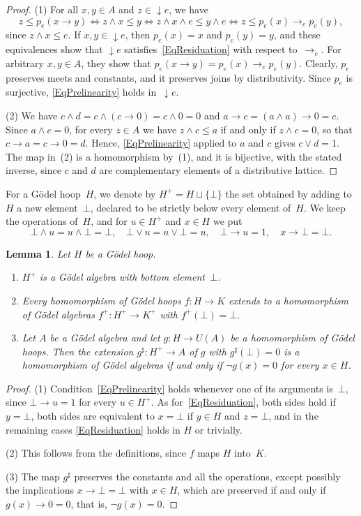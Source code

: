 \documentclass[reqno,a4paper]{amsart}
\theoremstyle{plain}
\newtheorem{lemma}[subsection]{Lemma}
\theoremstyle{definition}
\theoremstyle{remark}
\numberwithin{equation}{section}
\newcommand{\down}{{\downarrow}}
\begin{document}
\begin{proof}
(1) For all $x,y\in A$ and $z\in{\down}e$, we have
\[
z\leq p_e(x\to y)\iff z\wedge x\leq y\iff z\wedge x\wedge e\leq y\wedge e\iff z\leq p_e(x)\to_e p_e(y),
\]
since $z\wedge x\leq e$. If $x,y\in{\down}e$, then $p_e(x)=x$ and $p_e(y)=y$, and these equivalences show that ${\down}e$ satisfies~\eqref{EqResiduation} with respect to~$\to_e$. For arbitrary $x,y\in A$, they show that $p_e(x\to y)=p_e(x)\to_e p_e(y)$. Clearly, $p_e$ preserves meets and constants, and it preserves joins by distributivity. Since $p_e$ is surjective, \eqref{EqPrelinearity} holds in~${\down}e$.

(2) We have $c\wedge d=c\wedge(c\to0)=c\wedge0=0$ and $a\to c=(a\wedge a)\to0=c$. Since $a\wedge c=0$, for every $z\in A$ we have $z\wedge c\leq a$ if and only if $z\wedge c=0$, so that $c\to a=c\to0=d$. Hence, \eqref{EqPrelinearity} applied to $a$ and $c$ gives $c\vee d=1$. The map in~(2) is a homomorphism by~(1), and it is bijective, with the stated inverse, since $c$ and $d$ are complementary elements of a distributive lattice.
\end{proof}

For a G\"odel hoop~$H$, we denote by $H^+=H\sqcup\{\bot\}$ the set obtained by adding to~$H$ a new element~$\bot$, declared to be strictly below every element of~$H$. We keep the operations of~$H$, and for $u\in H^+$ and $x\in H$ we put
\[
\bot\wedge u=u\wedge\bot=\bot,\quad \bot\vee u=u\vee\bot=u,\quad \bot\to u=1,\quad x\to\bot=\bot.
\]

\begin{lemma}\label{LemPlus}
Let $H$ be a G\"odel hoop.
\begin{enumerate}
\item $H^+$ is a G\"odel algebra with bottom element~$\bot$.
\item Every homomorphism of G\"odel hoops $f\colon H\to K$ extends to a homomorphism of G\"odel algebras $f^+\colon H^+\to K^+$ with $f^+(\bot)=\bot$.
\item Let $A$ be a G\"odel algebra and let $g\colon H\to U(A)$ be a homomorphism of G\"odel hoops. Then the extension $g^\sharp\colon H^+\to A$ of $g$ with $g^\sharp(\bot)=0$ is a homomorphism of G\"odel algebras if and only if $\neg g(x)=0$ for every $x\in H$.
\end{enumerate}
\end{lemma}

\begin{proof}
(1) Condition~\eqref{EqPrelinearity} holds whenever one of its arguments is~$\bot$, since $\bot\to u=1$ for every $u\in H^+$. As for~\eqref{EqResiduation}, both sides hold if $y=\bot$, both sides are equivalent to $x=\bot$ if $y\in H$ and $z=\bot$, and in the remaining cases \eqref{EqResiduation} holds in $H$ or trivially.

(2) This follows from the definitions, since $f$ maps $H$ into~$K$.

(3) The map $g^\sharp$ preserves the constants and all the operations, except possibly the implications $x\to\bot=\bot$ with $x\in H$, which are preserved if and only if $g(x)\to0=0$, that is, $\neg g(x)=0$.
\end{proof}
\end{document}
